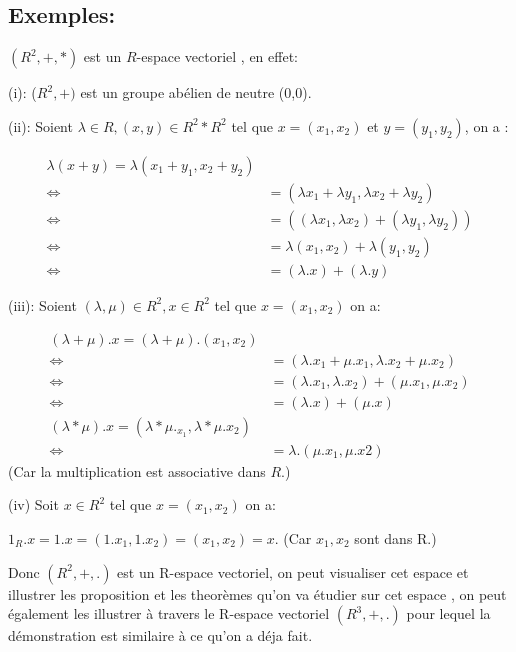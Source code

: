 \documentclass{book}
\begin{document}
\subsection{Exemples: }
\((R^2,+,*) \) est un \(R\)-espace vectoriel , en effet:
\begin{itemize}
    \item (i): (\(R^2, +)\) est un groupe abélien de neutre (0,0).
    \item (ii): Soient \(\lambda \in R, (x,y) \in R^2 * R^2\) tel que \(x=(x_1, x_2)\) et \(y= (y_1,y_2)\), on a :
    \begin{center}
    \begin{align*}
    \lambda(x+y)=
    \lambda(x_1+y_1,x_2+y_2) \\
    \Leftrightarrow \qquad &=(\lambda x_1+\lambda y_1,\lambda x_2+\lambda y_2) \\
    \Leftrightarrow \qquad &=((\lambda x_1,\lambda x_2) +(\lambda y_1,\lambda y_2))\\
\Leftrightarrow \qquad &=\lambda(x_1,x_2)+\lambda(y_1,y_2)\\
    \Leftrightarrow \qquad &=(\lambda.x)+(\lambda.y)
    \end{align*}
    \end{center}
    \item (iii): Soient \((\lambda, \mu) \in R^2, x \in R^2\) tel que \(x=(x_1, x_2)\)  on a:
\begin{center}
\begin{align*}
    (\lambda + \mu).x =(\lambda+\mu).(x_1,x_2)
\\
    \Leftrightarrow  &=(\lambda.x_1+\mu.x_1,\lambda.x_2+\mu.x_2) \\
    \Leftrightarrow  &=(\lambda.x_1,\lambda.x_2)+(\mu.x_1, \mu.x_2)\\
    \Leftrightarrow  &=(\lambda.x)+(\mu.x)
\\
(\lambda * \mu).x=(\lambda *\mu._x_1,\lambda*\mu.x_2) \\
    \Leftrightarrow  &=\lambda.(\mu.x_1, \mu.x2)
\end{align*}
(Car la multiplication est associative dans \(R\).)

\item (iv) Soit \(x \in R^2\) tel que \(x=(x_1,x_2)\) on a:

\(1_R.x=1.x=(1.x_1,1.x_2)=(x_1,x_2)=x\).
(Car \(x_1, x_2\) sont dans R.)
    
\end{center} 
\end{itemize}
Donc \((R^2,+,.)\) est un R-espace vectoriel, on peut visualiser cet espace et illustrer les proposition et les theorèmes qu'on va étudier sur cet espace , on peut également les illustrer à travers le R-espace vectoriel \((R^3, +,.) \) pour lequel la démonstration est similaire à ce qu'on a déja fait.
\end{document}

